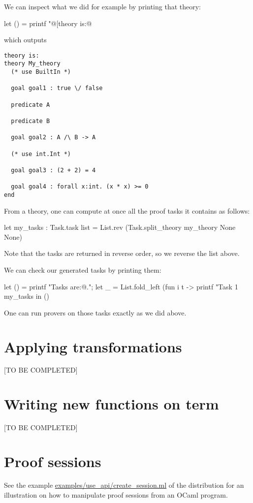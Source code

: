 We can inspect what we did for example by printing that theory:
\begin{ocamlcode}
let () = printf "@[theory is:@\n%
\end{ocamlcode}
which outputs
\begin{verbatim}
theory is:
theory My_theory
  (* use BuiltIn *)
  
  goal goal1 : true \/ false
  
  predicate A
  
  predicate B
  
  goal goal2 : A /\ B -> A
  
  (* use int.Int *)
  
  goal goal3 : (2 + 2) = 4
  
  goal goal4 : forall x:int. (x * x) >= 0
end
\end{verbatim}

From a theory, one can compute at once all the proof tasks it contains
as follows:
\begin{ocamlcode}
let my_tasks : Task.task list = 
  List.rev (Task.split_theory my_theory None None)
\end{ocamlcode}
Note that the tasks are returned in reverse order, so we reverse the
list above.

We can check our generated tasks by printing them:
\begin{ocamlcode}
let () = 
  printf "Tasks are:@.";
  let _ =
    List.fold_left
      (fun i t -> printf "Task %
      1 my_tasks
  in ()
\end{ocamlcode}

One can run provers on those tasks exactly as we did above.

\section{Applying transformations}

[TO BE COMPLETED]

\section{Writing new functions on term}

[TO BE COMPLETED]

\section{Proof sessions}

See the example \url{examples/use_api/create_session.ml} of the distribution for
an illustration on how to manipulate proof sessions from an OCaml program.




